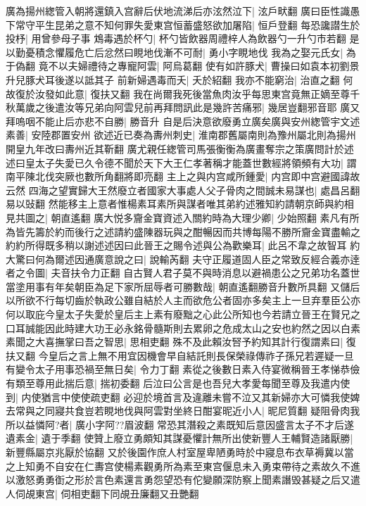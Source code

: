 廣為揚州緫管入朝將還鎮入宫辭后伏地流涕后亦泫然泣下|{
	泫戶畎翻}
廣曰臣性識愚下常守平生昆弟之意不知何罪失愛東宫恒蓄盛怒欲加屠陷|{
	恒戶登翻}
每恐讒譛生於投杼|{
	用曾參母子事}
鴆毒遇於杯勺|{
	杯勺皆飲器周禮梓人為飲器勺一升勺市若翻}
是以勤憂積念懼履危亡后忿然曰睍地伐漸不可耐|{
	勇小字睍地伐}
我為之娶元氏女|{
	為于偽翻}
竟不以夫婦禮待之專寵阿雲|{
	阿烏葛翻}
使有如許豚犬|{
	曹操曰如袁本初劉景升兒豚犬耳後遂以詆其子}
前新婦遇毒而夭|{
	夭於紹翻}
我亦不能窮治|{
	治直之翻}
何故復於汝發如此意|{
	復扶又翻}
我在尚爾我死後當魚肉汝乎每思東宫竟無正嫡至尊千秋萬歲之後遣汝等兄弟向阿雲兒前再拜問訊此是幾許苦痛邪|{
	幾居豈翻邪音耶}
廣又拜嗚咽不能止后亦悲不自勝|{
	勝音升}
自是后決意欲廢勇立廣矣廣與安州緫管宇文述素善|{
	安陸郡置安州}
欲述近已奏為夀州刺史|{
	淮南郡舊屬南則為豫州屬北則為揚州開皇九年改曰夀州近其靳翻}
廣尤親任緫管司馬張衡衡為廣畫奪宗之策廣問計於述述曰皇太子失愛已久令德不聞於天下大王仁孝著稱才能蓋世數經將領頻有大功|{
	謂南平陳北伐突厥也數所角翻將即亮翻}
主上之與内宫咸所鍾愛|{
	内宫即中宫避國諱故云然}
四海之望實歸大王然廢立者國家大事處人父子骨肉之間誠未易謀也|{
	處昌呂翻易以䜴翻}
然能移主上意者惟楊素耳素所與謀者唯其弟約述雅知約請朝京師與約相見共圖之|{
	朝直遙翻}
廣大悦多齎金寶資述入關約時為大理少卿|{
	少始照翻}
素凡有所為皆先籌於約而後行之述請約盛陳器玩與之酣暢因而共博每陽不勝所齎金寶盡輸之約約所得既多稍以謝述述因曰此晉王之賜令述與公為歡樂耳|{
	此呂不韋之故智耳}
約大驚曰何為爾述因通廣意說之曰|{
	說輸芮翻}
夫守正履道固人臣之常致反經合義亦逹者之令圖|{
	夫音扶令力正翻}
自古賢人君子莫不與時消息以避禍患公之兄弟功名蓋世當塗用事有年矣朝臣為足下家所屈辱者可勝數哉|{
	朝直遙翻勝音升數所具翻}
又儲后以所欲不行每切齒於執政公雖自結於人主而欲危公者固亦多矣主上一旦弃羣臣公亦何以取庇今皇太子失愛於皇后主上素有廢黜之心此公所知也今若請立晉王在賢兄之口耳誠能因此時建大功王必永銘骨髓斯則去累卵之危成太山之安也約然之因以白素素聞之大喜撫掌曰吾之智思|{
	思相吏翻}
殊不及此賴汝唘予約知其計行復謂素曰|{
	復扶又翻}
今皇后之言上無不用宜因機會早自結託則長保榮祿傳祚子孫兄若遲疑一旦有變令太子用事恐禍至無日矣|{
	令力丁翻}
素從之後數日素入侍宴微稱晉王孝悌恭儉有類至尊用此揣后意|{
	揣初委翻}
后泣曰公言是也吾兒大孝愛每聞至尊及我遣内使到|{
	内使猶言中使使疏吏翻}
必迎於境首言及違離未嘗不泣又其新婦亦大可憐我使婢去常與之同寢共食豈若睍地伐與阿雲對坐終日酣宴昵近小人|{
	昵尼質翻}
疑阻骨肉我所以益憐阿?者|{
	廣小字阿??眉波翻}
常恐其潛殺之素既知后意因盛言太子不才后遂遺素金|{
	遺于季翻}
使贊上廢立勇頗知其謀憂懼計無所出使新豐人王輔賢造諸厭勝|{
	新豐縣屬京兆厭於協翻}
又於後園作庶人村室屋卑陋勇時於中寢息布衣草褥冀以當之上知勇不自安在仁夀宫使楊素觀勇所為素至東宫偃息未入勇束帶待之素故久不進以激怒勇勇衘之形於言色素還言勇怨望恐有佗變願深防察上聞素譖毁甚疑之后又遣人伺覘東宫|{
	伺相吏翻下同覘丑廉翻又丑艷翻}
